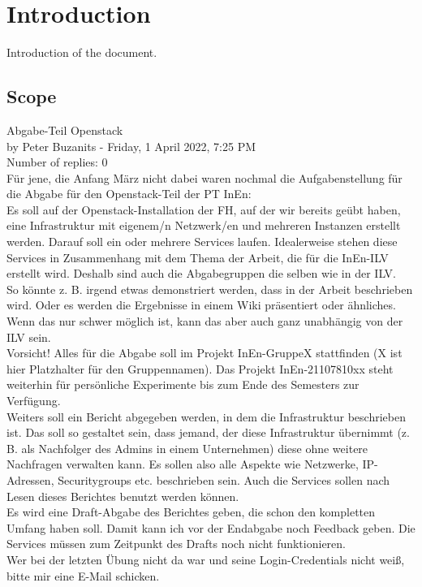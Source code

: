 \section{Introduction}
Introduction of the document.

\subsection{Scope}

Abgabe-Teil Openstack \\
by Peter Buzanits - Friday, 1 April 2022, 7:25 PM \\
Number of replies: 0 \\

\noindent
Für jene, die Anfang März nicht dabei waren nochmal die Aufgabenstellung für
die Abgabe für den Openstack-Teil der PT InEn: \\

\noindent
Es soll auf der Openstack-Installation der FH, auf der wir bereits geübt
haben, eine Infrastruktur mit eigenem/n Netzwerk/en und mehreren Instanzen
erstellt werden. Darauf soll ein oder mehrere Services laufen. Idealerweise
stehen diese Services in Zusammenhang mit dem Thema der Arbeit, die für die
InEn-ILV erstellt wird. Deshalb sind auch die Abgabegruppen die selben wie in
der ILV. \\

\noindent
So könnte z. B. irgend etwas demonstriert werden, dass in der Arbeit
beschrieben wird. Oder es werden die Ergebnisse in einem Wiki präsentiert oder
ähnliches. Wenn das nur schwer möglich ist, kann das aber auch ganz
unabhängig von der ILV sein. \\

\noindent
Vorsicht! Alles für die Abgabe soll im Projekt InEn-GruppeX stattfinden (X ist
hier Platzhalter für den Gruppennamen). Das Projekt InEn-21107810xx steht
weiterhin für persönliche Experimente bis zum Ende des Semesters zur
Verfügung. \\

\noindent
Weiters soll ein Bericht abgegeben werden, in dem die Infrastruktur beschrieben
ist. Das soll so gestaltet sein, dass jemand, der diese Infrastruktur
übernimmt (z. B. als Nachfolger des Admins in einem Unternehmen) diese ohne
weitere Nachfragen verwalten kann. Es sollen also alle Aspekte wie Netzwerke,
IP-Adressen, Securitygroups etc. beschrieben sein. Auch die Services sollen
nach Lesen dieses Berichtes benutzt werden können. \\

\noindent
Es wird eine Draft-Abgabe des Berichtes geben, die schon den kompletten Umfang
haben soll. Damit kann ich vor der Endabgabe noch Feedback geben. Die Services
müssen zum Zeitpunkt des Drafts noch nicht funktionieren. \\

\noindent
Wer bei der letzten Übung nicht da war und seine Login-Credentials nicht
weiß, bitte mir eine E-Mail schicken. \\

